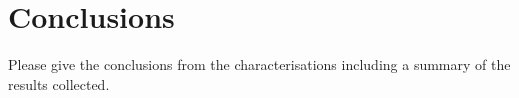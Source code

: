 \section{Conclusions}
\label{sec:conclusions}
Please give the conclusions from the characterisations including a summary of the results collected.